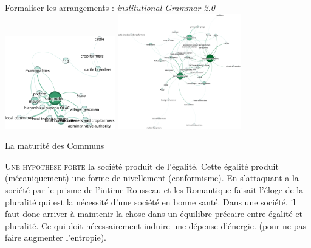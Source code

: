 \documentclass[newPxFont]{beamer}
\begin{document}
\begin{frame}[c]{Formaliser les arrangements : \textit{institutional Grammar 2.0}}
    \vspace{-1cm}
    \includegraphics[height=4cm]{img/sg_agent_Admin.png}
    \includegraphics[height=5cm]{img/sg_popLozc.png}
\end{frame}

  \begin{frame}[c]{La maturité des Communs}
    \vspace{-1cm}
    
    \small{
      \begin{alertblock}{\textsc{Une hypothese forte}}
        la société produit de l’égalité. Cette égalité produit (mécaniquement) une forme de nivellement (conformisme). En s’attaquant a la société par le prisme de l’intime Rousseau et les Romantique faisait l’éloge de la pluralité qui est la nécessité d'une société en bonne santé. Dans une société, il faut donc arriver à maintenir la chose dans un équilibre précaire entre égalité et pluralité. Ce qui doit nécessairement induire une dépense d’énergie. (pour ne pas faire augmenter l'entropie). 
      \end{alertblock}
    }
  
  \end{frame}
  
\end{document}

